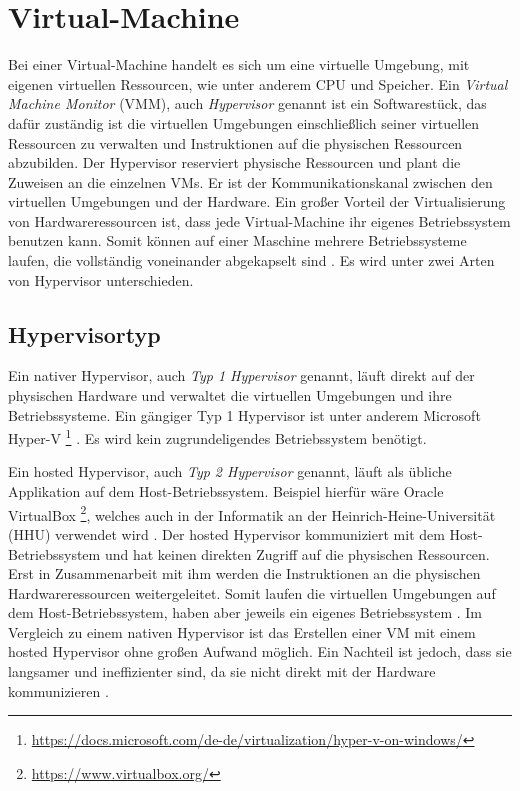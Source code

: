 \section{Virtual-Machine}
Bei einer Virtual-Machine handelt es sich um eine virtuelle Umgebung, mit 
eigenen virtuellen Ressourcen, wie unter anderem CPU und Speicher.
Ein \emph{Virtual Machine Monitor} (VMM), auch \emph{Hypervisor} genannt
ist ein Softwarestück, das dafür zuständig ist die 
virtuellen Umgebungen einschließlich seiner virtuellen Ressourcen zu verwalten
und Instruktionen auf die physischen Ressourcen abzubilden.
Der Hypervisor reserviert physische Ressourcen und plant die Zuweisen
an die einzelnen VMs. Er ist der Kommunikationskanal 
zwischen den virtuellen Umgebungen und der Hardware.
Ein großer Vorteil der Virtualisierung von Hardwareressourcen
ist, dass jede Virtual-Machine ihr eigenes Betriebssystem
benutzen kann. Somit können auf einer Maschine
mehrere Betriebssysteme laufen, die vollständig voneinander abgekapselt sind
\cite{RedHatVM} \cite{RedHatHypervisor}. Es wird unter zwei
Arten von Hypervisor unterschieden.

\subsection{Hypervisortyp}
Ein nativer Hypervisor, auch \emph{Typ 1 Hypervisor} genannt, läuft direkt auf der physischen Hardware
und verwaltet die virtuellen Umgebungen und ihre Betriebssysteme. Ein gängiger Typ 1 Hypervisor ist
unter anderem Microsoft Hyper-V
\footnote{\url{https://docs.microsoft.com/de-de/virtualization/hyper-v-on-windows/}}
\cite{RedHatHypervisor}. Es wird kein zugrundeligendes Betriebssystem
benötigt.

Ein hosted Hypervisor, auch \emph{Typ 2 Hypervisor}  genannt, läuft als übliche
Applikation auf dem Host-Betriebssystem. Beispiel hierfür wäre Oracle VirtualBox
\footnote{\url{https://www.virtualbox.org/}}, welches auch in der Informatik
an der Heinrich-Heine-Universität (HHU) verwendet wird \cite{HHUFachschaft}.
Der hosted Hypervisor kommuniziert mit dem Host-Betriebssystem und hat keinen direkten Zugriff auf die
physischen Ressourcen. Erst in Zusammenarbeit mit ihm
werden die Instruktionen an die physischen Hardwareressourcen weitergeleitet.
Somit laufen die virtuellen Umgebungen auf dem Host-Betriebssystem,
haben aber jeweils ein eigenes Betriebssystem \cite{RedHatHypervisor}.
Im Vergleich zu einem nativen Hypervisor ist das Erstellen einer VM
mit einem hosted Hypervisor ohne großen Aufwand möglich.
Ein Nachteil ist jedoch, dass sie langsamer und ineffizienter sind, da sie nicht
direkt mit der Hardware kommunizieren \cite{IBMHypervisor}.

